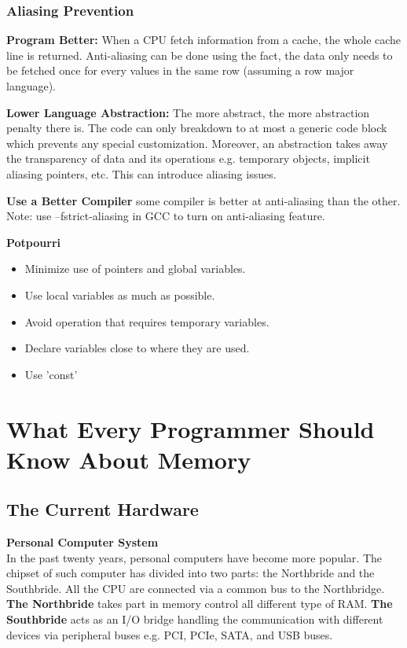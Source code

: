 \documentclass[journal]{IEEEtran}
\begin{document}
\subsubsection{Aliasing Prevention}
\begin{description}
   \item\textbf{Program Better:} When a CPU fetch information from a cache,
      the whole cache line is returned. Anti-aliasing can be done using the
      fact, the data only needs to be fetched once for every values in the
      same row (assuming a row major language).
   \item\textbf{Lower Language Abstraction:} The more abstract, the more 
      abstraction penalty there is. The code can only breakdown to at most
      a generic code block which prevents any special customization. 
      Moreover, an abstraction takes away the transparency of data and its 
      operations e.g. temporary objects, implicit aliasing pointers, etc. 
      This can introduce aliasing issues.
   \item\textbf{Use a Better Compiler} some compiler is better at 
      anti-aliasing than the other. Note: use –fstrict-aliasing in GCC
      to turn on anti-aliasing feature. 
      \newline
   \item\textbf{Potpourri}
      \begin{itemize}
	 \item Minimize use of pointers and global variables.
	 \item Use local variables as much as possible.
	 \item Avoid operation that requires temporary variables.
	 \item Declare variables close to where they are used.
	 \item Use 'const'
      \end{itemize}
\end{description}

\section{What Every Programmer Should Know About Memory}
\subsection{The Current Hardware}
\textbf{Personal Computer System\\}
In the past twenty years, personal computers have become more popular. 
The chipset of such computer has divided into two parts: the Northbride and 
the Southbride.  All the CPU are connected via a common bus to the 
Northbridge. \textbf{The Northbride} takes part in memory control all 
different type of RAM. \textbf{The Southbride} acts as an I/O bridge 
handling the communication with different devices via peripheral buses e.g.
PCI, PCIe, SATA, and USB buses.\newline
\end{document}
